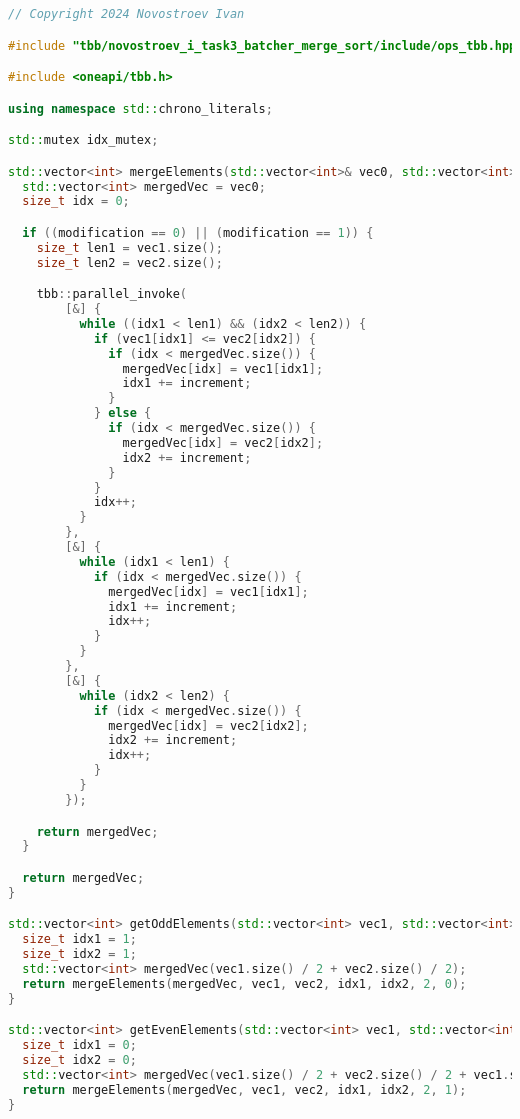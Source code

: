 \documentclass{report}
\begin{document}
\newpage

\begin{lstlisting}[language=C++,caption=TBB версия]
// Copyright 2024 Novostroev Ivan

#include "tbb/novostroev_i_task3_batcher_merge_sort/include/ops_tbb.hpp"

#include <oneapi/tbb.h>

using namespace std::chrono_literals;

std::mutex idx_mutex;

std::vector<int> mergeElements(std::vector<int>& vec0, std::vector<int>& vec1, std::vector<int>& vec2, size_t idx1, size_t idx2, size_t increment, int modification) {
  std::vector<int> mergedVec = vec0;
  size_t idx = 0;

  if ((modification == 0) || (modification == 1)) {
    size_t len1 = vec1.size();
    size_t len2 = vec2.size();

    tbb::parallel_invoke(
        [&] {
          while ((idx1 < len1) && (idx2 < len2)) {
            if (vec1[idx1] <= vec2[idx2]) {
              if (idx < mergedVec.size()) {
                mergedVec[idx] = vec1[idx1];
                idx1 += increment;
              }
            } else {
              if (idx < mergedVec.size()) {
                mergedVec[idx] = vec2[idx2];
                idx2 += increment;
              }
            }
            idx++;
          }
        },
        [&] {
          while (idx1 < len1) {
            if (idx < mergedVec.size()) {
              mergedVec[idx] = vec1[idx1];
              idx1 += increment;
              idx++;
            }
          }
        },
        [&] {
          while (idx2 < len2) {
            if (idx < mergedVec.size()) {
              mergedVec[idx] = vec2[idx2];
              idx2 += increment;
              idx++;
            }
          }
        });

    return mergedVec;
  }

  return mergedVec;
}

std::vector<int> getOddElements(std::vector<int> vec1, std::vector<int> vec2) {
  size_t idx1 = 1;
  size_t idx2 = 1;
  std::vector<int> mergedVec(vec1.size() / 2 + vec2.size() / 2);
  return mergeElements(mergedVec, vec1, vec2, idx1, idx2, 2, 0);
}

std::vector<int> getEvenElements(std::vector<int> vec1, std::vector<int> vec2) {
  size_t idx1 = 0;
  size_t idx2 = 0;
  std::vector<int> mergedVec(vec1.size() / 2 + vec2.size() / 2 + vec1.size() % 2 + vec2.size() % 2);
  return mergeElements(mergedVec, vec1, vec2, idx1, idx2, 2, 1);
}


\end{lstlisting}
\end{document}
